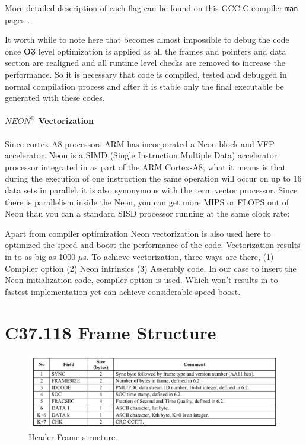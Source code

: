 \begin{appendix}
More detailed description of each flag can be found on this GCC C compiler \texttt{man} pages \cite{compilerOpti}.

It worth while to note here that becomes almost impossible to debug the code once \textbf{O3} level optimization is applied as all the frames and pointers and data section are realigned and all runtime level checks are removed to increase the performance. So it is necessary that code is compiled, tested and debugged in normal compilation process and after it is stable only the final executable be generated with these codes.

\subsubsection{$NEON ^{\circledR}$ Vectorization }
Since cortex A8 processors ARM has incorporated a Neon block and VFP accelerator. Neon is a SIMD (Single Instruction Multiple Data) accelerator processor integrated in as part of the ARM Cortex-A8, what it means is that  during the execution of one instruction the same operation will occur on up to 16 data sets in parallel, it is also synonymous with the term vector processor. Since there is parallelism inside the Neon, you can get more MIPS or FLOPS out of Neon than you can a standard SISD processor running at the same clock rate:

  Apart from compiler optimization Neon vectorization is also used here to optimized the speed and boost the performance of the code. Vectorization results in to as big as \~1000 $\mu$s. To achieve vectorization, three ways are there, (1) Compiler option (2) Neon intrinsics (3) Assembly code. In our case to insert the Neon initialization code, compiler option is used. Which won't results in to fastest implementation yet can achieve considerable speed boost.


\chapter{C37.118 Frame Structure}


\begin{figure}[h]
	\includegraphics[width=\textwidth]{fig/hdr_frame.png}
	\caption{Header Frame structure \cite{c37.118.2}}
\end{figure}


\end{appendix}

